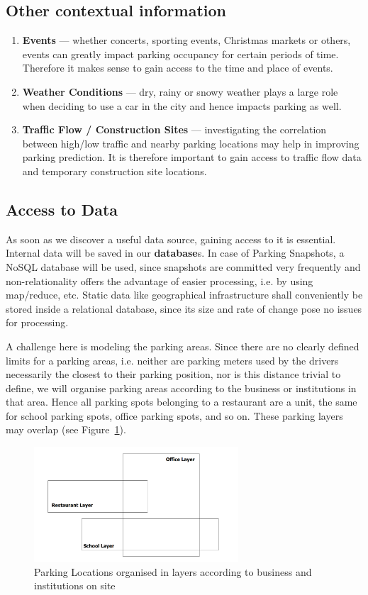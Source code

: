 \documentclass{article}
\begin{document}
\subsection{Other contextual information}
\label{other-context-info}
\begin{enumerate}
\item \textbf{Events} --- whether concerts, sporting events, Christmas markets or others, events can greatly impact parking occupancy for certain periods of time. Therefore it makes sense to gain access to the time and place of events.
\item \textbf{Weather Conditions} --- dry, rainy or snowy weather plays a large role when deciding to use a car in the city and hence impacts parking as well.
\item \textbf{Traffic Flow / Construction Sites} --- investigating the correlation between high/low traffic and nearby parking locations may help in improving parking prediction. It is therefore important to gain access to traffic flow data and temporary construction site locations.
\end{enumerate}

\subsection{Access to Data}
\label{sec:access-to-data}
As soon as we discover a useful data source, gaining access to it is essential. Internal data will be saved in our \textbf{database}s. In case of Parking Snapshots, a NoSQL database will be used, since snapshots are committed very frequently and non-relationality offers the advantage of easier processing, i.e. by using map/reduce, etc. Static data like geographical infrastructure shall conveniently be stored inside a relational database, since its size and rate of change pose no issues for processing.

A challenge here is modeling the parking areas. Since there are no clearly defined limits for a parking areas, i.e. neither are parking meters used by the drivers necessarily the closest to their parking position, nor is this distance trivial to define, we will organise parking areas according to the business or institutions in that area. Hence all parking spots belonging to a restaurant are a unit, the same for school parking spots, office parking spots, and so on. These parking layers may overlap (see Figure~\ref{fig:parking-layers}).

\begin{figure}[!ht]
    \centering
    \includegraphics[width=3.0in]{ParkingLayers}
    \caption{Parking Locations organised in layers according to business and institutions on site}
    \label{fig:parking-layers}
\end{figure}
\end{document}
